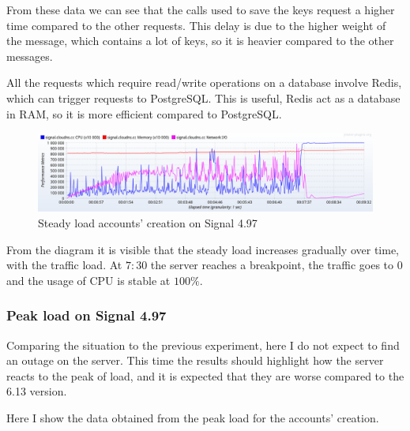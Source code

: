 From these data we can see that the calls used to save the keys request a higher time compared to the other requests.
This delay is due to the higher weight of the message, which contains a lot of keys, so it is heavier compared to the other messages.

All the requests which require read/write operations on a database involve Redis, which can trigger requests to PostgreSQL.
This is useful, Redis act as a database in RAM, so it is more efficient compared to PostgreSQL.

\begin{figure}[H]
    \centering
    \includegraphics[width=\textwidth]{images/497/4.97-steady-create}
    \caption{Steady load accounts' creation on Signal 4.97}
    \label{fig:signalbasecreateloadold}
\end{figure}

From the diagram it is visible that the steady load increases gradually over time, with the traffic load. At $7:30$ the server reaches a breakpoint, the traffic goes to $0$ and the usage of CPU is stable at $100\%$.

\subsubsection{Peak load on Signal 4.97}

Comparing the situation to the previous experiment, here I do not expect to find an outage on the server. This time the results should highlight how the server reacts to the peak of load, and it is expected that they are worse compared to the 6.13 version.

Here I show the data obtained from the peak load for the accounts' creation.

